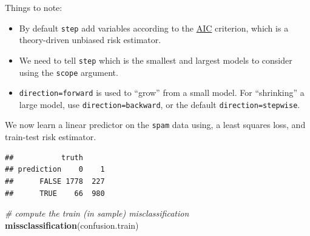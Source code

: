 \documentclass[]{book}
\newenvironment{Shaded}{\begin{snugshade}}{\end{snugshade}}
\newcommand{\KeywordTok}[1]{\textcolor[rgb]{0.13,0.29,0.53}{\textbf{#1}}}
\newcommand{\DataTypeTok}[1]{\textcolor[rgb]{0.13,0.29,0.53}{#1}}
\newcommand{\DecValTok}[1]{\textcolor[rgb]{0.00,0.00,0.81}{#1}}
\newcommand{\FloatTok}[1]{\textcolor[rgb]{0.00,0.00,0.81}{#1}}
\newcommand{\StringTok}[1]{\textcolor[rgb]{0.31,0.60,0.02}{#1}}
\newcommand{\CommentTok}[1]{\textcolor[rgb]{0.56,0.35,0.01}{\textit{#1}}}
\newcommand{\OperatorTok}[1]{\textcolor[rgb]{0.81,0.36,0.00}{\textbf{#1}}}
\newcommand{\NormalTok}[1]{#1}
\providecommand{\tightlist}{%
  \setlength{\itemsep}{0pt}\setlength{\parskip}{0pt}}
\theoremstyle{definition}
\theoremstyle{definition}
\theoremstyle{definition}
\theoremstyle{remark}
\begin{document}
Things to note:

\begin{itemize}
\tightlist
\item
  By default \texttt{step} add variables according to the
  \href{https://en.wikipedia.org/wiki/Akaike_information_criterion}{AIC}
  criterion, which is a theory-driven unbiased risk estimator.
\item
  We need to tell \texttt{step} which is the smallest and largest models
  to consider using the \texttt{scope} argument.
\item
  \texttt{direction=\textquotesingle{}forward\textquotesingle{}} is used
  to ``grow'' from a small model. For ``shrinking'' a large model, use
  \texttt{direction=\textquotesingle{}backward\textquotesingle{}}, or
  the default
  \texttt{direction=\textquotesingle{}stepwise\textquotesingle{}}.
\end{itemize}

We now learn a linear predictor on the \texttt{spam} data using, a least
squares loss, and train-test risk estimator.

\begin{Shaded}
\end{Shaded}

\begin{verbatim}
##           truth
## prediction    0    1
##      FALSE 1778  227
##      TRUE    66  980
\end{verbatim}

\begin{Shaded}
\begin{Highlighting}[]
\CommentTok{# compute the train (in sample) misclassification}
\KeywordTok{missclassification}\NormalTok{(confusion.train) }
\end{Highlighting}
\end{Shaded}
\end{document}
